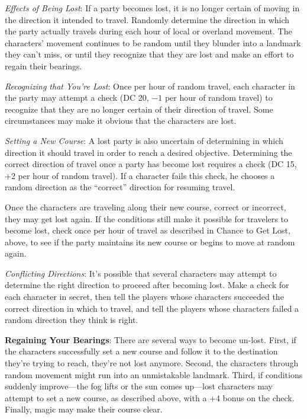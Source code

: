 \textit{Effects of Being Lost}: If a party becomes lost, it is no longer certain of moving in the direction it intended to travel. Randomly determine the direction in which the party actually travels during each hour of local or overland movement. The characters' movement continues to be random until they blunder into a landmark they can't miss, or until they recognize that they are lost and make an effort to regain their bearings.

\textit{Recognizing that You're Lost}: Once per hour of random travel, each character in the party may attempt a  check (DC 20, $-1$ per hour of random travel) to recognize that they are no longer certain of their direction of travel. Some circumstances may make it obvious that the characters are lost.

\textit{Setting a New Course}: A lost party is also uncertain of determining in which direction it should travel in order to reach a desired objective. Determining the correct direction of travel once a party has become lost requires a  check (DC 15, +2 per hour of random travel). If a character fails this check, he chooses a random direction as the ``correct'' direction for resuming travel.

Once the characters are traveling along their new course, correct or incorrect, they may get lost again. If the conditions still make it possible for travelers to become lost, check once per hour of travel as described in Chance to Get Lost, above, to see if the party maintains its new course or begins to move at random again.

\textit{Conflicting Directions}: It's possible that several characters may attempt to determine the right direction to proceed after becoming lost. Make a  check for each character in secret, then tell the players whose characters succeeded the correct direction in which to travel, and tell the players whose characters failed a random direction they think is right.

\textbf{Regaining Your Bearings}: There are several ways to become un-lost. First, if the characters successfully set a new course and follow it to the destination they're trying to reach, they're not lost anymore. Second, the characters through random movement might run into an unmistakable landmark. Third, if conditions suddenly improve---the fog lifts or the sun comes up---lost characters may attempt to set a new course, as described above, with a +4 bonus on the  check. Finally, magic may make their course clear.

